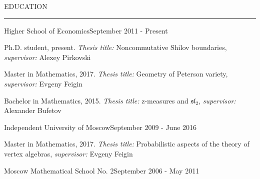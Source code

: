 \documentclass{resume} %
\renewenvironment{rSection}[1]{
\sectionskip
\textcolor{RoyalPurple}{\MakeUppercase{#1}}
\sectionlineskip
\hrule
\begin{list}{}{
\setlength{\leftmargin}{1.5em}
}
\item[]
}{
\end{list}
}
\begin{document}

\begin{rSection}{Education}

\begin{rSubsection}{Higher School of Economics}{September 2011 - Present}{}{}
\item Ph.D. student, present. \textit{Thesis title:} Noncommutative Shilov boundaries, {\it supervisor:} Alexey Pirkovski
\item Master in Mathematics, 2017. \textit{Thesis title:} Geometry of Peterson variety, {\it supervisor:} Evgeny Feigin
\item Bachelor in Mathematics, 2015. \textit{Thesis title:} z-measures and $\mathfrak{sl}_2$, {\it supervisor:} Alexander Bufetov
\end{rSubsection}

\begin{rSubsection}{Independent University of Moscow}{September 2009 - June 2016}{}{}
\item Master in Mathematics, 2017. \textit{Thesis title:} Probabilistic aspects of the theory of vertex algebras, {\it supervisor:} Evgeny Feigin
\end{rSubsection}

\begin{rSubsection}{Moscow Mathematical School No. 2}{September 2006 - May 2011}{}{}
\end{rSubsection}


\end{rSection}

\end{document}

